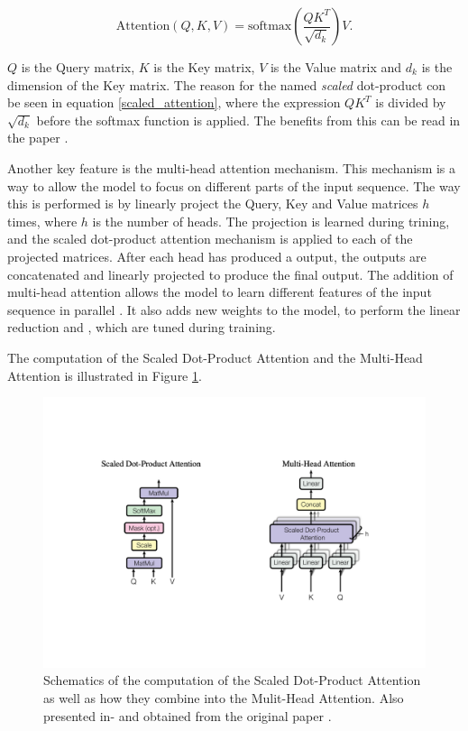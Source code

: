 \begin{equation}
    \label{scaled_attention}
    \text{Attention}(Q, K, V) = \text{softmax}(\frac{QK^T}{\sqrt{d_k}})V.
\end{equation}

$Q$ is the Query matrix, $K$ is the Key matrix, $V$ is the Value matrix and $d_k$ is the dimension of the Key matrix.
The reason for the named \textit{scaled} dot-product con be seen in equation \ref{scaled_attention},
where the expression $QK^T$ is divided by $\sqrt{d_k}$  before the softmax function is applied.
The benefits from this can be read in the paper \cite{vaswani2023attention}.

Another key feature is the multi-head attention mechanism. This mechanism is a way to allow the model to focus on different parts of the input sequence.
The way this is performed is by linearly project the Query, Key and Value matrices $h$ times, where $h$ is the number of heads.
The projection is learned during trining, and the scaled dot-product attention mechanism is applied to each of the projected matrices.
After each head has produced a output, the outputs are concatenated and linearly projected to produce the final output.
The addition of multi-head attention allows the model to learn different features of the input sequence in parallel \cite{vaswani2023attention}.
It also adds new weights to the model, to perform the linear reduction and , which are tuned during training.

The computation of the Scaled Dot-Product Attention and the Multi-Head Attention is illustrated in Figure \ref{fig:scaleddotproduct_and_multihead}.


\begin{figure}[h!]
    \centering %
    \includegraphics[scale=0.3]{../figs/Scaled_mulit_head.pdf} %
    \caption{Schematics of the computation of the Scaled Dot-Product Attention as well as how they combine into the Mulit-Head Attention. Also presented in- and obtained from the original paper \cite{vaswani2023attention}.} %
    \label{fig:scaleddotproduct_and_multihead}
\end{figure}

